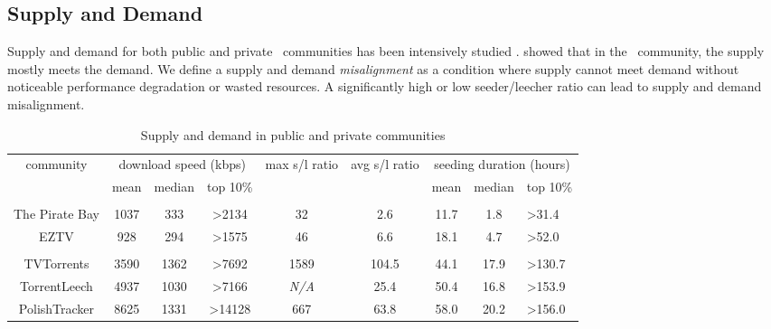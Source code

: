 \subsection{Supply and Demand}
\label{section:suppdemand}
Supply and demand for both public and private \bt~communities has been intensively studied \cite{2010:pubpriv:meulpolder, 2009:demandsupplyres:andrade}. \citeauthor{2009:demandsupplyres:andrade} showed that in the \bt~community, the supply mostly meets the demand. We define a supply and demand \textit{misalignment} as a condition where supply cannot meet demand without noticeable performance degradation or wasted resources. A significantly high or low seeder/leecher ratio can lead to supply and demand misalignment.

\begin{table}[]
	\centering
	\caption{Supply and demand in public and private communities \cite{2010:pubpriv:meulpolder}}
	\label{tbl:supdemand}
	\begin{adjustwidth}{-1.5cm}{}
		\begin{tabular}{|c|c|c|c|c|c|c|c|l|}
			\hline
			\multicolumn{1}{|c|}{\multirow{2}{0.1\linewidth}{community}} &  \multicolumn{3}{c|}{download speed (kbps)} & \multicolumn{1}{c|}{\multirow{2}{0.1\linewidth}{max s/l ratio}} & \multicolumn{1}{c|}{\multirow{2}{0.1\linewidth}{avg s/l ratio}} & \multicolumn{3}{c|}{seeding duration (hours)} \\ \cline{2-4} \cline{7-9} 
			\multicolumn{1}{|c|}{} & {mean} & {median} & {top 10\%} & {} & {} & {mean} & {median} & {top 10\%} \\ \hline
			\multicolumn{8}{l}{} \\ \hline
			The Pirate Bay & {1037} & {333} & {\textgreater2134} & 32 & {2.6} & {11.7} & {1.8} & {\textgreater31.4} \\ \hline
			EZTV  & {928} & {294} & {\textgreater1575} & 46 & {6.6} & {18.1} & {4.7} & {\textgreater52.0} \\ \hline
			\multicolumn{8}{l}{} \\ \hline
			TVTorrents & 3590 & 1362 & \textgreater7692 & 1589 & 104.5 & 44.1 & 17.9 & \textgreater130.7 \\ \hline
			TorrentLeech  & {4937} & {1030} & {\textgreater7166} & \textit{N/A} & {25.4} & {50.4} & {16.8} & {\textgreater153.9} \\ \hline
			PolishTracker  & {8625} & {1331} & {\textgreater14128} & 667 & {63.8} & {58.0} & {20.2} & {\textgreater156.0} \\ \hline
		\end{tabular}
	\end{adjustwidth}
\end{table}

